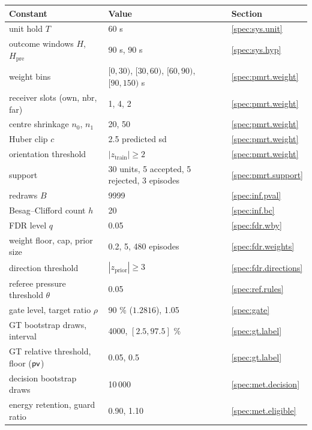 \begin{tabular}{@{}p{}p{}p{}@{}}
\toprule
Constant & Value & Section \\
\midrule
unit hold $T$ & 60 s & \ref{spec:sys.unit} \\
outcome windows $H$, $H_{\mathrm{pre}}$ & 90 s, 90 s & \ref{spec:sys.hyp} \\
weight bins & $[0,30)$, $[30,60)$, $[60,90)$, $[90,150)$ s & \ref{spec:pmrt.weight} \\
receiver slots (own, nbr, far) & 1, 4, 2 & \ref{spec:pmrt.weight} \\
centre shrinkage $n_0$, $n_1$ & 20, 50 & \ref{spec:pmrt.weight} \\
Huber clip $c$ & 2.5 predicted sd & \ref{spec:pmrt.weight} \\
orientation threshold & $|z_{\mathrm{train}}| \ge 2$ & \ref{spec:pmrt.weight} \\
support & 30 units, 5 accepted, 5 rejected, 3 episodes & \ref{spec:pmrt.support} \\
redraws $B$ & 9999 & \ref{spec:inf.pval} \\
Besag--Clifford count $h$ & 20 & \ref{spec:inf.bc} \\
FDR level $q$ & 0.05 & \ref{spec:fdr.wby} \\
weight floor, cap, prior size & 0.2, 5, 480 episodes & \ref{spec:fdr.weights} \\
direction threshold & $|z_{\mathrm{prior}}| \ge 3$ & \ref{spec:fdr.directions} \\
referee pressure threshold $\theta$ & 0.05 & \ref{spec:ref.rules} \\
gate level, target ratio $\rho$ & 90 \% ($1.2816$), 1.05 & \ref{spec:gate} \\
GT bootstrap draws, interval & 4000, $[2.5, 97.5]$ \% & \ref{spec:gt.label} \\
GT relative threshold, floor ($\mathsf{pv}$) & 0.05, 0.5 & \ref{spec:gt.label} \\
decision bootstrap draws & 10\,000 & \ref{spec:met.decision} \\
energy retention, guard ratio & 0.90, 1.10 & \ref{spec:met.eligible} \\
\bottomrule
\end{tabular}
